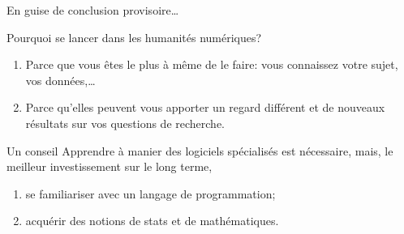 \documentclass[ignorenonframetext]{beamer}
\begin{document}
\begin{frame}{En guise de conclusion provisoire…}
	
	\begin{block}{Pourquoi se lancer dans les humanités numériques?}
		\begin{enumerate}
			\item Parce que vous êtes le plus à même de le faire: vous connaissez votre sujet, vos données,…
			\item Parce qu'elles peuvent vous apporter un regard différent et de nouveaux résultats sur vos questions de recherche.
		\end{enumerate}
	\end{block}

\begin{block}{Un conseil}
	Apprendre à manier des logiciels spécialisés est nécessaire, mais, le meilleur investissement sur le long terme,
	\begin{enumerate}
		\item se familiariser avec un langage de programmation;
		\item acquérir des notions de stats et de mathématiques.
	\end{enumerate}
\end{block}	
	
\end{frame}
\end{document}

